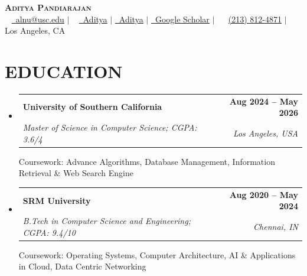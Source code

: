 \documentclass[letterpaper,11pt]{article}
\makeatletter
\newcommand{\resumeSubheading}[4]{
  \vspace{-2pt}\item
    \begin{tabular*}{1.0\textwidth}[t]{l@{\extracolsep{\fill}}r}
      \textbf{#1} & \textbf{\small #2} \\
      \textit{\small#3} & \textit{\small #4} \\
    \end{tabular*}\vspace{-3pt}
}
\newcommand{\resumeSubHeadingListStart}{\begin{itemize}[leftmargin=0.0in, label={}]}
\newcommand{\resumeSubHeadingListEnd}{\end{itemize}}
\makeatother
\begin{document}
\vspace{+1cm}
\begin{center}
    {\Huge \scshape \textbf{Aditya Pandiarajan}} \\ \vspace{1pt}
    \small ~ \href{mailto:alnu@usc.edu}{\raisebox{-0.2\height}\faEnvelope\ \underline{\color{blue}alnu@usc.edu}} $|$\hspace{-.2cm} ~
    \href{https://www.linkedin.com/in/aditya-pandiarajan7/}{\raisebox{-0.2\height}\faLinkedin\ \underline{\color{blue}Aditya}} $|$
    \href{https://github.com/Aditya10CR7}{\raisebox{-0.2\height}\faGithubSquare\ \underline{\color{blue}Aditya}} $|$
    \href{https://scholar.google.com/citations?user=UlKY2ZQAAAAJ&hl=en}{\raisebox{-0.2\height}\faGoogle\ \underline{\color{blue}Google Scholar}} $|$\hspace{-.2cm}
    \small ~ {\raisebox{-0.2\height}\Telefon\ \underline{\color{blue}(213) 812-4871}} {} $|$\hspace{-.2cm}
    \small ~ {Los Angeles, CA}
    \vspace{-8pt}
\end{center}


\section{\large{{EDUCATION}}}
\resumeSubHeadingListStart

  \resumeSubheading
    {University of Southern California}{Aug 2024 -- May 2026}
    {Master of Science in Computer Science; CGPA: 3.6/4}{Los Angeles, USA}
  \vspace{3pt}
  {\small Coursework: Advance Algorithms, Database Management, Information Retrieval \& Web Search Engine}

  \vspace{-10pt}

  \resumeSubheading
    {SRM University}{Aug 2020 -- May 2024}
    {B.Tech in Computer Science and Engineering; CGPA: 9.4/10}{Chennai, IN}
  \vspace{-2pt}
  {\small Coursework: Operating Systems, Computer Architecture, AI \& Applications in Cloud, Data Centric Networking}

\resumeSubHeadingListEnd

\vspace{-17pt}

\end{document}
